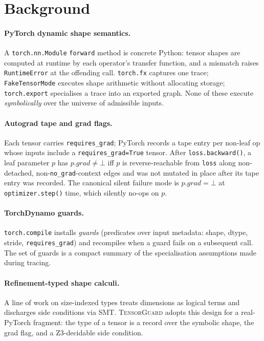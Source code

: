 \section{Background}\label{sec:background}

\paragraph{PyTorch dynamic shape semantics.} A
\verb|torch.nn.Module| \verb|forward| method is concrete Python: tensor
shapes are computed at runtime by each operator's transfer function,
and a mismatch raises \texttt{RuntimeError} at the offending call.
\texttt{torch.fx} captures one trace; \texttt{FakeTensorMode} executes
shape arithmetic without allocating storage; \texttt{torch.export}
specialises a trace into an exported graph. None of these execute
\emph{symbolically} over the universe of admissible inputs.

\paragraph{Autograd tape and grad flags.} Each tensor carries
\texttt{requires\_grad}; PyTorch records a tape entry per non-leaf op
whose inputs include a \texttt{requires\_grad=True} tensor. After
\texttt{loss.backward()}, a leaf parameter $p$ has $p.\mathit{grad}\neq
\bot$ iff $p$ is reverse-reachable from \texttt{loss} along non-detached,
non-\texttt{no\_grad}-context edges and was not mutated in place after
its tape entry was recorded. The canonical silent failure mode is
$p.\mathit{grad}=\bot$ at \texttt{optimizer.step()} time,
which silently no-ops on $p$.

\paragraph{TorchDynamo guards.} \texttt{torch.compile} installs
\emph{guards} (predicates over input metadata: shape, dtype, stride,
\texttt{requires\_grad}) and recompiles when a guard fails on a
subsequent call. The set of guards is a compact summary of the
specialisation assumptions made during tracing.

\paragraph{Refinement-typed shape calculi.} A line of work on
size-indexed types \citep{xi1998dependent,vazou2014liquid,
sheard2007language} treats dimensions as logical terms and discharges
side conditions via SMT. \textsc{TensorGuard} adopts this design for a
real-PyTorch fragment: the type of a tensor is a record over the
symbolic shape, the grad flag, and a Z3-decidable side condition.
